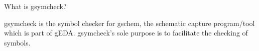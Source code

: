  What is gsymcheck? 

  gsymcheck is the symbol checker for gschem, the schematic capture program/tool which is part of gEDA. gsymcheck's sole purpose is to facilitate the checking of symbols. 
